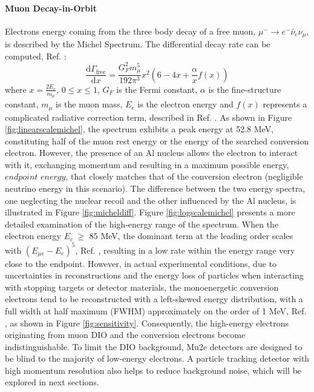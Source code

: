 \paragraph{Muon Decay-in-Orbit}
Electrons energy coming from the three body decay of a free muon, $\mu^- \rightarrow e^- \bar{\nu}_e \nu_\mu$, is described by the Michel Spectrum. The differential decay rate can be computed, Ref. \cite{michel}:
\begin{equation}
    \frac{\text{d}\Gamma_{\text{free}}}{\text{d}x}= \frac{G^2_F m^5_\mu}{192 \pi^3}x^2(6-4x+\frac{\alpha}{x}f(x)) 
\end{equation}
where $x=\frac{2 E_e}{m_\mu}$, $0\leq x\leq 1$, $G_F$ is the Fermi constant, $\alpha$ is the fine-structure constant, $m_\mu$ is the muon mass, $E_e$ is the electron energy and $f (x)$ represents a complicated radiative correction term, described in Ref. \cite{PhysRev.113.1652}. 
As shown in Figure \ref{fig:linearscalemichel}, the spectrum exhibits a peak energy at 52.8 MeV, constituting half of the muon rest energy  or the energy of the searched conversion electron. However, the presence of an Al nucleus allows the electron to interact with it, exchanging momentum and resulting in a maximum possible energy, $endpoint$ $energy$, that closely matches that of the conversion electron (negligible neutrino energy in this scenario). The difference between the two energy spectra, one neglecting the nuclear recoil and the other influenced by the Al nucleus, is illustrated in Figure \ref{fig:micheldiff}. Figure \ref{fig:logscalemichel} presents a more detailed examination of the high-energy range of the spectrum. When the electron energy $E_e \ \geq$ 85 MeV, the dominant term at the leading order scales with $(E_{\mu e} - E_e)^5$, Ref. \cite{PhysRevD.84.013006}, resulting in a low rate within the energy range very close to the endpoint. However, in actual experimental conditions, due to uncertainties in reconstructions and the energy loss of particles when interacting with stopping targets or detector materials, the monoenergetic conversion electrons tend to be reconstructed with a left-skewed energy distribution, with a full width at half maximum (FWHM) approximately on the order of 1 MeV, Ref. \cite{gaponenko}, as shown in Figure \ref{fig:sensitivity}. Consequently, the high-energy electrons originating from muon DIO and the conversion electrons become indistinguishable. To limit the DIO background, Mu2e detectors are designed to be blind to the majority of low-energy electrons. A particle tracking detector with high momentum resolution also helps to reduce background noise, which will be explored in next sections.
